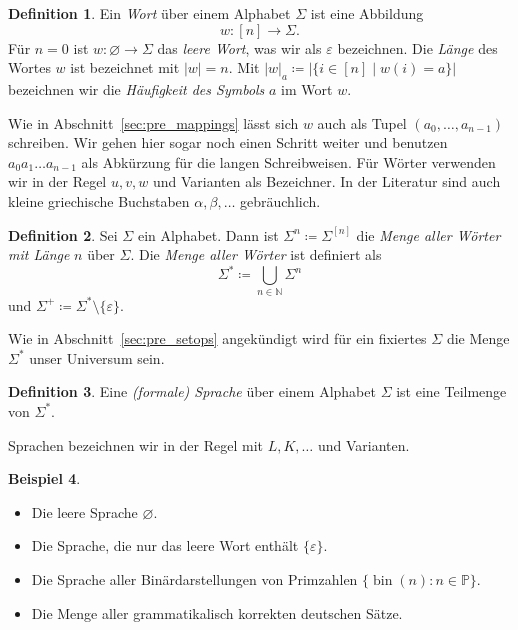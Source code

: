 \documentclass[11pt, a4paper]{article}
\theoremstyle{definition}
\newtheorem{definition}{Definition}[section]
\newtheorem{example}[definition]{Beispiel}
\theoremstyle{plain}
\numberwithin{equation}{section}
\DeclareMathOperator{\bin}{bin}
\let\emptyset\varnothing
\begin{document}
\begin{definition}
	Ein \textit{Wort} über einem Alphabet $\Sigma$ ist eine Abbildung
	$$
		w\colon [n] \to \Sigma.
	$$
	Für $n = 0$ ist $w\colon \emptyset \to \Sigma$ das \textit{leere Wort}, was wir als $\varepsilon$ bezeichnen.	Die \textit{Länge} des Wortes $w$ ist bezeichnet mit $|w| = n$. Mit $|w|_a \coloneqq \left| \{ i \in [n] \mid w(i) = a \} \right|$ bezeichnen wir die \textit{Häufigkeit des Symbols} $a$ im Wort $w$.
\end{definition}
Wie in Abschnitt~\ref{sec:pre_mappings} lässt sich $w$ auch als Tupel $(a_0, \ldots, a_{n-1})$ schreiben. Wir gehen hier sogar noch einen Schritt weiter und benutzen $a_0 a_1 \ldots a_{n-1}$ als Abkürzung für die langen Schreibweisen. Für Wörter verwenden wir in der Regel $u, v, w$ und Varianten als Bezeichner. In der Literatur sind auch kleine griechische Buchstaben $\alpha, \beta, \ldots$ gebräuchlich.
\begin{definition}
	Sei $\Sigma$ ein Alphabet. Dann ist $\Sigma^n \coloneqq \Sigma^{[n]}$ die \textit{Menge aller Wörter mit Länge} $n$ über $\Sigma$.
	Die \textit{Menge aller Wörter} ist definiert als
	$$
		\Sigma^\ast \coloneqq \bigcup_{n \in \mathbb{N}} \Sigma^n
	$$
	und $\Sigma^+ \coloneqq \Sigma^\ast \setminus \{ \varepsilon \}$.
\end{definition}
Wie in Abschnitt~\ref{sec:pre_setops} angekündigt wird für ein fixiertes $\Sigma$ die Menge $\Sigma^\ast$ unser Universum sein.
\begin{definition}
	Eine \textit{(formale) Sprache} über einem Alphabet $\Sigma$ ist eine Teilmenge von $\Sigma^\ast$.
\end{definition}
Sprachen bezeichnen wir in der Regel mit $L, K, \ldots$ und Varianten.
\begin{example}
	\
	\begin{itemize}
		\item Die leere Sprache $\emptyset$.
		\item Die Sprache, die nur das leere Wort enthält $\{ \varepsilon \}$.
		\item Die Sprache aller Binärdarstellungen von Primzahlen $\{ \bin(n) : n \in \mathbb{P} \}$.
		\item Die Menge aller grammatikalisch korrekten deutschen Sätze.
	\end{itemize}
\end{example}
\end{document}
